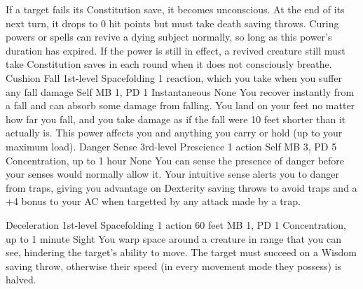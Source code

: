 If a target fails its Constitution save, it becomes unconscious.
At the end of its next turn, it drops to 0 hit points but
must take death saving throws. Curing powers or spells can
revive a dying subject normally, so long as this power's
duration has expired.
If the power is still in effect, a revived
creature still must take Constitution saves in each round
when it does not consciously breathe.
\DndPowerHeader%
    {Cushion Fall\label{pwr:cushion_fall}}
    {1st-level Spacefolding}
    {1 reaction, which you take when you suffer any fall damage}
    {Self}
    {MB 1, PD 1}
    {Instantaneous}
    {None}
You recover instantly from a fall and can
absorb some damage from falling. You land on your feet no
matter how far you fall, and you take damage as if the fall
were 10 feet shorter than it actually is. This power affects
you and anything you carry or hold (up to your maximum load).
\DndPowerHeader%
    {Danger Sense\label{pwr:danger_sense}}
    {3rd-level Prescience}
    {1 action}
    {Self}
    {MB 3, PD 5}
    {Concentration, up to 1 hour}
    {None}
You can sense the presence of danger before
your senses would normally allow it. Your intuitive sense
alerts you to danger from traps, giving you advantage on Dexterity
saving throws to avoid traps and a +4 bonus to your AC when
targetted by any attack made by a trap.

\DndPowerHeader%
    {Deceleration\label{pwr:deceleration}}
    {1st-level Spacefolding}
    {1 action}
    {60 feet}
    {MB 1, PD 1}
    {Concentration, up to 1 minute}
    {Sight}
You warp space around a creature in range
that you can see, hindering the target's ability to move.
The target must succeed on a Wisdom saving throw, otherwise
their speed (in every movement mode they possess) is halved.

